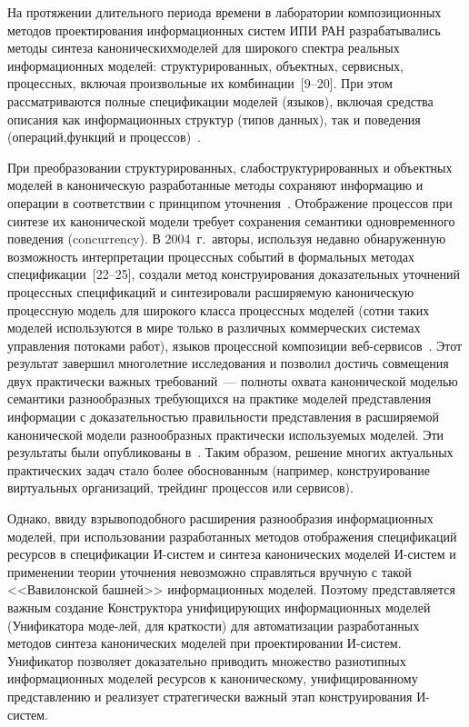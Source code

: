 \begin{multicols}{2}
На протяжении длительного периода времени в лаборатории композиционных
методов проектирования информационных систем ИПИ РАН разрабатывались
методы синтеза канонических\linebreak моделей для широкого спектра реальных
информационных моделей: структурированных, объектных, сервисных,
процессных, включая произвольные их комбинации~[9--20].
При этом рассматриваются полные спецификации моделей (языков), включая средства
описания как информационных структур (типов данных), так и поведения
(операций,\linebreak функций и процессов)~\cite{Ka05-2, Ka05-3, Ka97}.

При преобразовании структурированных,
слабоструктурированных и объектных моделей в ка\-но\-ни\-че\-скую
разработанные методы сохраняют %
инфор\-ма\-цию и операции в соответствии с
принципом уточ\-не\-ния~\cite{Ka97}. Отображение про\-цессов при синтезе их канонической
модели требует сохранения семантики одновременного поведения
(concurrency). В 2004~г.\ авторы, используя недавно обнаруженную
возможность интерпретации процессных событий в формальных методах
специфи\-ка\-ции~[22--25],
создали метод конструирования доказательных уточнений
про\-цес\-сных специ\-фи\-ка\-ций и синтезировали расширяемую каноническую
про\-цес\-сную модель для широкого класса про\-цес\-сных моделей (сотни таких
моделей используются в мире только в различных коммерческих системах
управ\-ле\-ния потоками работ), языков про\-цес\-сной композиции веб-сер\-ви\-сов~\cite{St06}.
Этот результат завер\-шил многолетние исследования и позволил
достичь %
совмеще\-ния двух практически важных требований~--- полноты охвата
канонической моделью семантики разнообразных требующихся на практи\-ке
моделей представления информации с доказательностью правильности
представления в расширяемой канонической модели разнообразных
практи\-че\-ски используемых моделей. Эти результаты \mbox{были} опубликованы в~\cite{Ka05-3}.
Таким образом, решение многих актуальных практических задач стало
более обоснованным (например, конструирование виртуальных организаций,
трейдинг процессов или сервисов).

Однако, ввиду взрывоподобного расширения разнообразия информационных
моделей, при использовании разработанных методов отображения
спецификаций ресурсов в спецификации И-систем и синтеза канонических
моделей И-систем и применении теории уточнения
невозможно справ\-лять\-ся вручную с такой <<Вавилонской башней>>
информационных моделей. Поэтому представляется важным создание Конструктора
унифициру\-ющих информационных моделей (Унификатора моде-\linebreak лей, для
краткости) для автоматизации разработанных методов синтеза
канонических моделей при проектировании И-систем. Унификатор позволяет
доказательно приводить множество разнотипных информационных моделей
ресурсов к каноническому, унифицированному представлению и реализует
стратегически важный этап конструирования И-систем.


\end{multicols}
